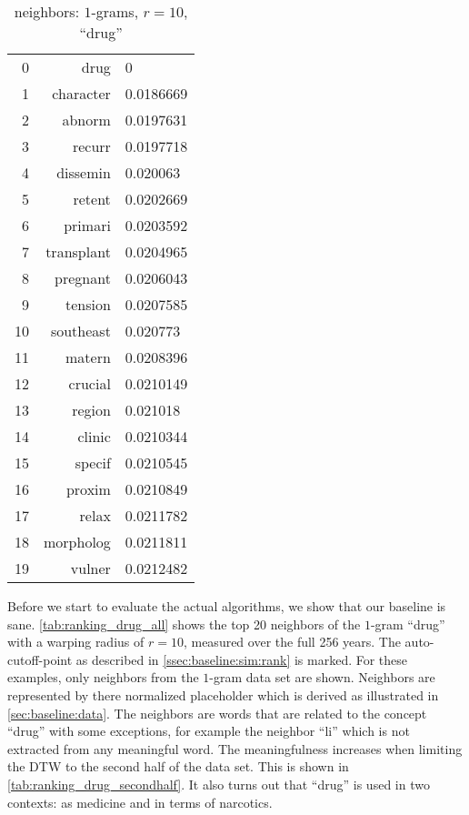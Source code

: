 \begin{table}[t]
\begin{subtable}[t]{.45\textwidth}
\begin{tabularx}{\textwidth}{r R l}
            \midrule
            \num{0} & drug & \num{0}\\
            \num{1} & character & \num{0.0186669}\\
            \num{2} & abnorm & \num{0.0197631}\\
            \num{3} & recurr & \num{0.0197718}\\
            \num{4} & dissemin & \num{0.020063}\\
            \num{5} & retent & \num{0.0202669}\\
            \num{6} & primari & \num{0.0203592}\\
            \num{7} & transplant & \num{0.0204965}\\
            \num{8} & pregnant & \num{0.0206043}\\
            \num{9} & tension & \num{0.0207585}\\
            \num{10} & southeast & \num{0.020773}\\
            \midrule
            \num{11} & matern & \num{0.0208396}\\
            \num{12} & crucial & \num{0.0210149}\\
            \num{13} & region & \num{0.021018}\\
            \num{14} & clinic & \num{0.0210344}\\
            \num{15} & specif & \num{0.0210545}\\
            \num{16} & proxim & \num{0.0210849}\\
            \num{17} & relax & \num{0.0211782}\\
            \num{18} & morpholog & \num{0.0211811}\\
            \num{19} & vulner & \num{0.0212482}\\
            \bottomrule
        \end{tabularx}
        \caption{$[129,256]$}\label{tab:ranking_drug_secondhalf}
    \end{subtable}
    \caption{neighbors: $1$-grams, $r = 10$, \enquote{drug}}\label{tab:ranking_drug_sane}
\end{table}

Before we start to evaluate the actual algorithms, we show that our baseline is sane. \autoref{tab:ranking_drug_all} shows the top \num{20} neighbors of the $1$-gram \enquote{drug} with a warping radius of $r = 10$, measured over the full \num{256} years. The auto-cutoff-point as described in \autoref{ssec:baseline:sim:rank} is marked. For these examples, only neighbors from the $1$-gram data set are shown. Neighbors are represented by there normalized placeholder which is derived as illustrated in \autoref{sec:baseline:data}. The neighbors are words that are related to the concept \enquote{drug} with some exceptions, for example the neighbor \enquote{li} which is not extracted from any meaningful word. The meaningfulness increases when limiting the DTW to the second half of the data set. This is shown in \autoref{tab:ranking_drug_secondhalf}. It also turns out that \enquote{drug} is used in two contexts: as medicine and in terms of narcotics.

